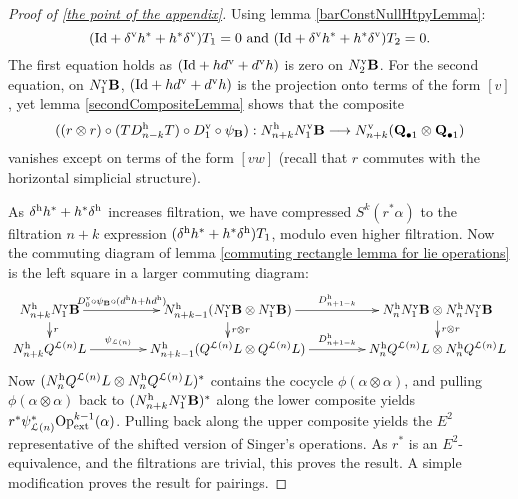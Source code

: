 \documentclass[11pt]{amsart}
\theoremstyle{plain}
\theoremstyle{definition}
\let\oldphi\phi
\let\phi\varphi
\renewcommand{\to}{\longrightarrow}
\newcommand{\calL}{\mathcal{L}}
\theoremstyle{plain}
\newcommand{\ExtCohOp}{\textup{Op}_\textup{ext}}
\begin{document}
\begin{appendices}
\begin{proof}[Proof of \ref{the point of the appendix}]
Using lemma \ref{barConstNullHtpyLemma}:
\[(\textup{Id}+\delta^\textup{v}h^*+ h^*\delta^\textup{v})T_1=0\textup{ and }(\textup{Id}+\delta^\textup{v}h^*+ h^*\delta^\textup{v})T_2=0.\]
The first equation holds as $(\textup{Id}+hd^\textup{v}+d^\textup{v}h)$ is zero on $N^\textup{v}_2\textbf{B}$. For the second equation, on $N^\textup{v}_1\textbf{B}$,  $(\textup{Id}+hd^\textup{v}+d^\textup{v}h)$ is the projection onto terms of the form $[v]$, yet lemma \ref{secondCompositeLemma} shows that the composite
\[((r\otimes r)\circ(TD^\textup{h}_{n-k}T)\circ D^\textup{v}_1\circ\psi_{\textup{\textbf{B}}}): N^\textup{h}_{n+k}N^\textup{v}_1\textbf{B}\to N^\textup{v}_{n+k}(\textbf{Q}_{\bullet1}\otimes \textbf{Q}_{\bullet1})\]
vanishes except on terms of the form $[vw]$ (recall that $r$ commutes with the horizontal simplicial structure).

As $\delta^\textup{h}h^*+ h^*\delta^\textup{h}$ increases filtration, we have compressed $S^k(r^*\alpha)$ to the filtration $n+k$ expression $(\delta^\textup{h}h^*+ h^*\delta^\textup{h})T_1$, modulo even higher filtration.
Now the commuting diagram of lemma \ref{commuting rectangle lemma for lie operations} is the left square in a larger commuting diagram:
\[\xymatrix@R=4mm@C=15mm{
N_{n+k}^\textup{h}N_1^\textup{v}\textbf{B} \ar[d]^-{r}
 \ar[r]^-{D^\textup{v}_0\circ\psi_{\textup{\textbf{B}}}\circ (d^\textup{h}h+hd^\textup{h})}&%
N_{n+k-1}^\textup{h}(N_1^\textup{v}\textbf{B}\otimes N_1^\textup{v}\textbf{B})\ar[d]^-{r\otimes r}\ar[r]^-{ D^\textup{h}_{n+1-k}}
&
N^\textup{h}_nN^\textup{v}_1\textbf{B}\otimes N^\textup{h}_nN^\textup{v}_1\textbf{B}\ar[d]^-{r\otimes r}
\\%
N_{n+k}^\textup{h}Q^{\calL(n)} L  \ar[r]^-{\psi_{\calL(n)}}&%
N_{n+k-1}^\textup{h}(Q^{\calL(n)} L \otimes Q^{\calL(n)} L )
\ar[r]^-{ D^\textup{h}_{n+1-k}}
&
N^\textup{h}_nQ^{\calL(n)} L \otimes N^\textup{h}_nQ^{\calL(n)} L 
}\]
Now $(N^\textup{h}_nQ^{\calL(n)} L \otimes N^\textup{h}_nQ^{\calL(n)} L )^*$ contains the cocycle $\oldphi(\alpha\otimes\alpha)$, and pulling $\oldphi(\alpha\otimes\alpha)$ back to $(N_{n+k}^\textup{h}N_1^\textup{v}\textbf{B})^*$ along the lower composite yields $r^*\psi_{\calL(n)}^*\ExtCohOp^{k-1}(\alpha)$. Pulling back along the upper composite yields the $E^2$ representative of the shifted version of Singer's operations. As $r^*$ is an $E^2$-equivalence, and the filtrations are trivial, this proves the result. A simple modification proves the result for pairings.
\end{proof}


\end{appendices}
\end{document}
